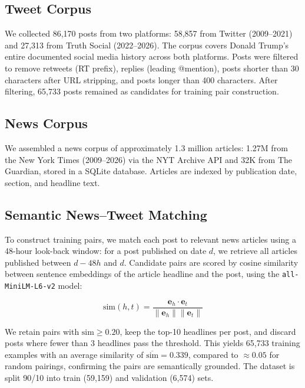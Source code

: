\documentclass[11pt,a4paper]{article}
\begin{document}
\subsection{Tweet Corpus}

We collected 86,170 posts from two platforms: 58,857 from Twitter (2009--2021) and 27,313 from Truth Social (2022--2026). The corpus covers Donald Trump's entire documented social media history across both platforms. Posts were filtered to remove retweets (RT prefix), replies (leading @mention), posts shorter than 30 characters after URL stripping, and posts longer than 400 characters. After filtering, 65,733 posts remained as candidates for training pair construction.

\subsection{News Corpus}

We assembled a news corpus of approximately 1.3 million articles: 1.27M from the New York Times (2009--2026) via the NYT Archive API and 32K from The Guardian, stored in a SQLite database. Articles are indexed by publication date, section, and headline text.

\subsection{Semantic News--Tweet Matching}

To construct training pairs, we match each post to relevant news articles using a 48-hour look-back window: for a post published on date $d$, we retrieve all articles published between $d-48h$ and $d$. Candidate pairs are scored by cosine similarity between sentence embeddings \citep{reimers2019sentence} of the article headline and the post, using the \texttt{all-MiniLM-L6-v2} model:

\begin{equation}
    \text{sim}(h, t) = \frac{\mathbf{e}_h \cdot \mathbf{e}_t}{\|\mathbf{e}_h\| \|\mathbf{e}_t\|}
\end{equation}

We retain pairs with $\text{sim} \geq 0.20$, keep the top-10 headlines per post, and discard posts where fewer than 3 headlines pass the threshold. This yields 65,733 training examples with an average similarity of $\overline{\text{sim}} = 0.339$, compared to $\approx 0.05$ for random pairings, confirming the pairs are semantically grounded. The dataset is split 90/10 into train (59,159) and validation (6,574) sets.
\end{document}
